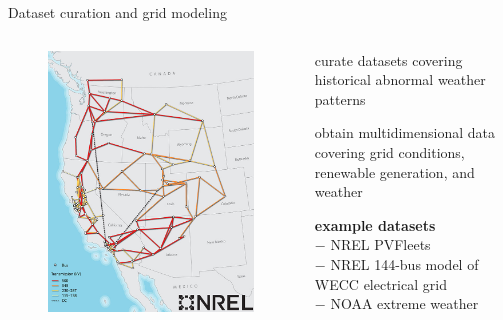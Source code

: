 \documentclass[aspectratio=169,11pt]{beamer}
\begin{document}
\begin{frame}{Dataset curation and grid modeling}
\begin{columns}
	\begin{column}{0.42\textwidth}
		\begin{figure}
			\centering
			\includegraphics[width=\columnwidth]{./figures/weccmap.jpg}
		\end{figure}
	\end{column}
	\begin{column}{0.58\textwidth}
		\BIT
		\item curate datasets covering historical abnormal weather patterns
		\item obtain multidimensional data covering grid conditions, renewable generation, and weather
		\item \textbf{example datasets} \\
		\hspace{12mm} $-$ NREL PVFleets \\
		\hspace{12mm} $-$ NREL 144-bus model of WECC electrical grid\\
		\hspace{12mm} $-$ NOAA extreme weather\\
		\EIT
	\end{column}
\end{columns}
\end{frame}
\end{document}
